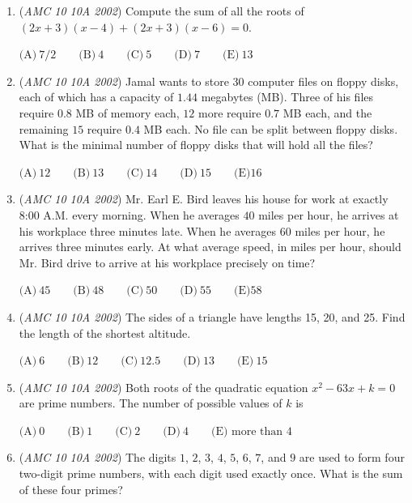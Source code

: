 \begin{enumerate}
 $\textbf{(A)}\ 1 \qquad \textbf{(B)}\ 3 \qquad \textbf{(C)}\ 6 \qquad \textbf{(D)}\ 9 \qquad \textbf{(E) }\text{Not uniquely determined}$


	\item (\textit{AMC 10 10A 2002}) Compute the sum of all the roots of $(2x + 3)(x - 4) + (2x + 3)(x - 6) = 0$.


 $\text{(A)}\ 7/2 \qquad \text{(B)}\ 4 \qquad \text{(C)}\ 5 \qquad \text{(D)}\ 7 \qquad \text{(E)}\ 13$


	\item (\textit{AMC 10 10A 2002}) Jamal wants to store $30$ computer files on floppy disks, each of which has a capacity of $1.44$ megabytes (MB). Three of his files require $0.8$ MB of memory each, $12$ more require $0.7$ MB each, and the remaining $15$ require $0.4$ MB each. No file can be split between floppy disks. What is the minimal number of floppy disks that will hold all the files?


 $\text{(A)}\ 12 \qquad \text{(B)}\ 13 \qquad \text{(C)}\ 14 \qquad \text{(D)}\ 15 \qquad \text{(E)} 16$


	\item (\textit{AMC 10 10A 2002}) Mr. Earl E. Bird leaves his house for work at exactly 8:00 A.M. every morning. When he averages $40$ miles per hour, he arrives at his workplace three minutes late. When he averages $60$ miles per hour, he arrives three minutes early. At what average speed, in miles per hour, should Mr. Bird drive to arrive at his workplace precisely on time?


 $\text{(A)}\ 45 \qquad \text{(B)}\ 48 \qquad \text{(C)}\ 50 \qquad \text{(D)}\ 55 \qquad \text{(E)} 58$


	\item (\textit{AMC 10 10A 2002}) The sides of a triangle have lengths 15, 20, and 25. Find the length of the shortest altitude.


 $\text{(A)}\ 6 \qquad \text{(B)}\ 12 \qquad \text{(C)}\ 12.5 \qquad \text{(D)}\ 13 \qquad \text{(E)}\ 15$


	\item (\textit{AMC 10 10A 2002}) Both roots of the quadratic equation $x^2 - 63x + k = 0$ are prime numbers. The number of possible values of $k$ is 


 $\text{(A)}\ 0 \qquad \text{(B)}\ 1 \qquad \text{(C)}\ 2 \qquad \text{(D)}\ 4 \qquad \text{(E) more than 4}$


	\item (\textit{AMC 10 10A 2002}) The digits $1$, $2$, $3$, $4$, $5$, $6$, $7$, and $9$ are used to form four two-digit prime numbers, with each digit used exactly once. What is the sum of these four primes?



\end{enumerate}
